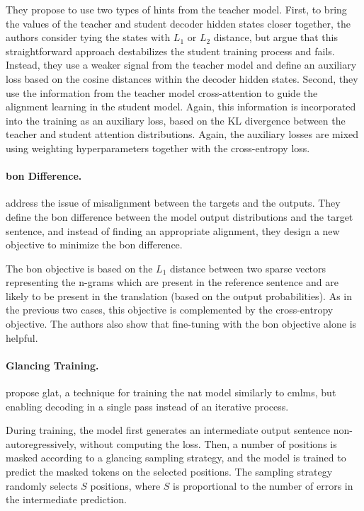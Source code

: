 They propose to use two types of hints from the teacher model. First, to bring
the values of the teacher and student decoder hidden states closer together,
the authors consider tying the states with $L_1$ or $L_2$ distance, but argue
that this straightforward approach destabilizes the student training process
and fails. Instead, they use a weaker signal from the teacher model and define
an auxiliary loss based on the cosine distances within the decoder hidden
states. Second, they use the information from the teacher model cross-attention
to guide the alignment learning in the student model. Again, this information
is incorporated into the training as an auxiliary loss, based on the KL
divergence between the teacher and student attention distributions.  Again, the
auxiliary losses are mixed using weighting hyperparameters together with the
cross-entropy loss. 

\paragraph{\Acl{bon} Difference.} \citet{shao2020minimizing} address the issue
of misalignment between the targets and the outputs. They define the \ac{bon}
difference between the model output distributions and the target sentence, and
instead of finding an appropriate alignment, they design a new objective to
minimize the \ac{bon} difference.

The \ac{bon} objective is based on the $L_1$ distance between two sparse
vectors representing the n-grams which are present in the reference sentence
and are likely to be present in the translation (based on the output
probabilities). As in the previous two cases, this objective is complemented by
the cross-entropy objective. The authors also show that fine-tuning with the
\ac{bon} objective alone is helpful.

\paragraph{Glancing Training.} \citet{qian-etal-2021-glancing,
  qian2021volctrans} propose \acf{glat}, a technique for
training the \ac{nat} model similarly to \acp{cmlm}, but enabling decoding in a
single pass instead of an iterative process.

During training, the model first generates an intermediate output sentence
non-autoregressively, without computing the loss. Then, a number of positions
is masked according to a glancing sampling strategy, and the model is trained
to predict the masked tokens on the selected positions. The sampling strategy
randomly selects $S$ positions, where $S$ is proportional to the number of
errors in the intermediate prediction.

